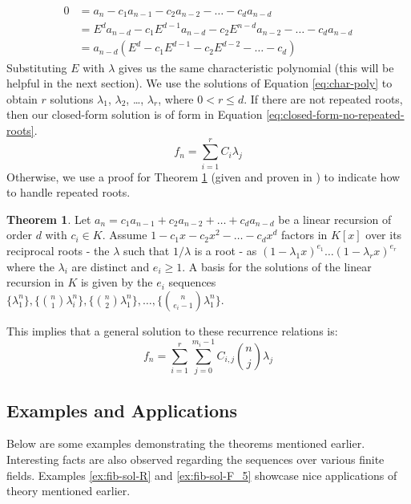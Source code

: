 \documentclass[a4paper]{article}
\theoremstyle{definition}
\newtheorem{theorem}{Theorem}[section]
\begin{document}
\begin{align*}
0
&= a_n-c_1a_{n-1}-c_2a_{n-2}-\ldots-c_da_{n-d} \\
&= E^da_{n-d}-c_1E^{d-1}a_{n-d}-c_2E^{n-d}a_{n-2}-\ldots-c_da_{n-d} \\
&= a_{n-d}(E^d-c_1E^{d-1}-c_2E^{d-2}-\ldots-c_d)
\end{align*}
Substituting $E$ with $\lambda$ gives us the same characteristic polynomial (this will be helpful in the next section). We use the solutions of Equation \ref{eq:char-poly} to obtain $r$ solutions $\lambda_1$, $\lambda_2$, \ldots, $\lambda_r$, where $0<r\le d$. If there are not repeated roots, then our closed-form solution is of form in Equation \ref{eq:closed-form-no-repeated-roots}.
\begin{equation}
f_n=\sum_{i=1}^r C_{i}\lambda_j
\label{eq:closed-form-no-repeated-roots}
\end{equation}
Otherwise, we use a proof for Theorem \ref{thm:repeated-roots} (given and proven in \cite{bib:solve-lin-rec-field}) to indicate how to handle repeated roots. 
\\
\begin{theorem}
Let $a_n = c_1a_{n-1} + c_2a_{n-2} + \ldots + c_da_{n-d}$ be a linear recursion of order $d$ with $c_i \in K$. Assume $1 - c_1x - c_2x^2 - \ldots - c_dx^d$ factors in $K[x]$ over its reciprocal roots - the $\lambda$ such that $1/\lambda$ is a root - as $(1-\lambda_1x)^{e_1} \ldots (1-\lambda_rx)^{e_r}$ where the $\lambda_i$ are distinct and $e_i \ge 1$. A basis for the solutions of the linear recursion in $K$ is given by the $e_i$ sequences $\{\lambda_1^n\}, \{\binom{n}{1}\lambda_i^n\}, \{\binom{n}{2}\lambda_1^n\}, \ldots, \{\binom{n}{e_i-1}\lambda_1^n\}$.
\label{thm:repeated-roots}
\end{theorem}
This implies that a general solution to these recurrence relations is:
\begin{equation}
f_n=\sum_{i=1}^r\sum_{j=0}^{m_i-1} C_{i,j}\binom{n}{j}\lambda_j
\label{eq:closed-form-repeated-roots}
\end{equation}

\subsection{Examples and Applications}

Below are some examples demonstrating the theorems mentioned earlier. Interesting facts are also
observed regarding the sequences over various finite fields. Examples \ref{ex:fib-sol-R} and
\ref{ex:fib-sol-F_5} showcase nice applications of theory mentioned earlier.
\\
\end{document}
